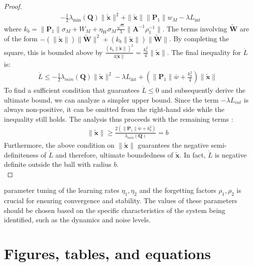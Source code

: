 \documentclass[10pt,twocolumn]{ICCAS}
\newcommand{\xtilde}{\tilde{\bm{x}}}
\newcommand{\Wtilde}{\tilde{\mathbf{W}}}
\begin{document}
\begin{proof}
\begin{align*}
    & - \frac{1}{2}\lambda_{\min}(\mathbf{Q})\|\xtilde\|^2 
    + \|\xtilde\|\|\mathbf{P}_1\|w_M 
    - \lambda L_{\text{int}}
\end{align*}
where $k_b = \|\mathbf{P}_1\|\sigma_M + W_M + \eta_W\sigma_M \frac{\sqrt{n}}{\lambda} \|\mathbf{A}^{-1}\rho_1^{-1}\|$. The terms involving $\Wtilde$ are of the form $-(\|\xtilde\|)\|\Wtilde\|^2 + (k_b\|\xtilde\|)\|\Wtilde\|$. By completing the square, this is bounded above by $\frac{(k_b\|\xtilde\|)^2}{4|\xtilde\|} = \frac{k_b^2}{4}\|\xtilde\|$.
The final inequality for $\dot{L}$ is:
\begin{align}
    \dot{L} \le -\frac{1}{2}\lambda_{min}(\mathbf{Q})\|\xtilde\|^2 - \lambda L_{\text{int}}+ \left( \|\mathbf{P}_1\|\bar{w} + \frac{k_b^2}{4} \right)\|\xtilde\|
\end{align}
To find a sufficient condition that guarantees $\dot{L} \le 0$ and subsequently derive the ultimate bound, we can analyze a simpler upper bound. Since the term $-\lambda L_{int}$ is always non-positive, it can be omitted from the right-hand side while the inequality still holds. The analysis thus proceeds with the remaining terms :
\begin{align}
    \|\xtilde\|\ge\frac{2\left( \|\mathbf{P}_1\|\bar{w} + k_b^2 \right)}{\lambda_{min}(\mathbf{Q})}=b
\end{align}
Furthermore, the above condition on $\|\xtilde\|$ guarantees the negative semi-definiteness of $\dot{L}$ and therefore, ultimate boundedness of $\xtilde$.
In fact, $\dot{L}$ is negative definite outside the ball with radius $b$.\\ 

\end{proof}


parameter tuning of the learning rates $\eta_1, \eta_2$ and the forgetting factors $\rho_1, \rho_2$ is crucial for ensuring convergence and stability. The values of these parameters should be chosen based on the specific characteristics of the system being identified, such as the dynamics and noise levels.


\section{Figures, tables, and equations}
\end{document}
